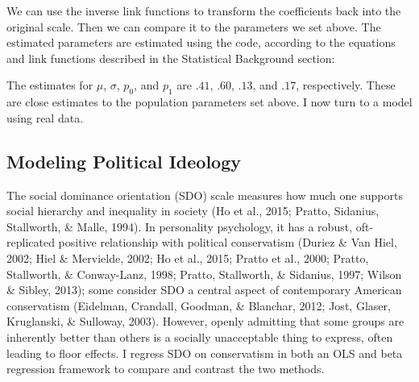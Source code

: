 \documentclass[english,man]{apa6}
\newenvironment{Shaded}{\begin{snugshade}}{\end{snugshade}}
\newcommand{\KeywordTok}[1]{\textcolor[rgb]{0.13,0.29,0.53}{\textbf{#1}}}
\newcommand{\DecValTok}[1]{\textcolor[rgb]{0.00,0.00,0.81}{#1}}
\newcommand{\StringTok}[1]{\textcolor[rgb]{0.31,0.60,0.02}{#1}}
\newcommand{\CommentTok}[1]{\textcolor[rgb]{0.56,0.35,0.01}{\textit{#1}}}
\newcommand{\ControlFlowTok}[1]{\textcolor[rgb]{0.13,0.29,0.53}{\textbf{#1}}}
\newcommand{\OperatorTok}[1]{\textcolor[rgb]{0.81,0.36,0.00}{\textbf{#1}}}
\newcommand{\NormalTok}[1]{#1}
\theoremstyle{definition}
\theoremstyle{definition}
\theoremstyle{remark}
\begin{document}
We can use the inverse link functions to transform the coefficients back
into the original scale. Then we can compare it to the parameters we set
above. The estimated parameters are estimated using the code, according
to the equations and link functions described in the Statistical
Background section:

\begin{Shaded}
\end{Shaded}

The estimates for \(\mu\), \(\sigma\), \(p_0\), and \(p_1\) are \(.41\),
\(.60\), \(.13\), and \(.17\), respectively. These are close estimates
to the population parameters set above. I now turn to a model using real
data.

\subsection{Modeling Political
Ideology}\label{modeling-political-ideology}

The social dominance orientation (SDO) scale measures how much one
supports social hierarchy and inequality in society (Ho et al., 2015;
Pratto, Sidanius, Stallworth, \& Malle, 1994). In personality
psychology, it has a robust, oft-replicated positive relationship with
political conservatism (Duriez \& Van Hiel, 2002; Hiel \& Mervielde,
2002; Ho et al., 2015; Pratto et al., 2000; Pratto, Stallworth, \&
Conway-Lanz, 1998; Pratto, Stallworth, \& Sidanius, 1997; Wilson \&
Sibley, 2013); some consider SDO a central aspect of contemporary
American conservatism (Eidelman, Crandall, Goodman, \& Blanchar, 2012;
Jost, Glaser, Kruglanski, \& Sulloway, 2003). However, openly admitting
that some groups are inherently better than others is a socially
unacceptable thing to express, often leading to floor effects. I regress
SDO on conservatism in both an OLS and beta regression framework to
compare and contrast the two methods.
\end{document}
